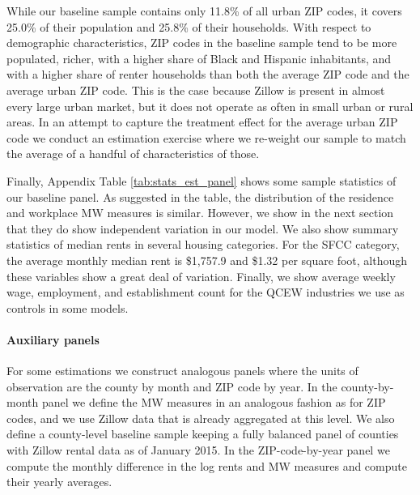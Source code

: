 While our baseline sample contains only 11.8\% of all urban ZIP codes, it covers
25.0\% of their population and 25.8\% of their households.
With respect to demographic characteristics, ZIP codes in the baseline sample 
tend to be more populated, richer, with a higher share of Black and Hispanic 
inhabitants, and with a higher share of renter households than both 
the average ZIP code and the average urban ZIP code.
This is the case because Zillow is present in almost every large urban market, 
but it does not operate as often in small urban or rural areas.
In an attempt to capture the treatment effect for the average urban ZIP code 
we conduct an estimation exercise where we re-weight our sample to match the 
average of a handful of characteristics of those.

Finally, Appendix Table \ref{tab:stats_est_panel} shows some sample statistics 
of our baseline panel.
As suggested in the table, the distribution of the residence and workplace MW 
measures is similar.
However, we show in the next section that they do show independent variation
in our model.
We also show summary statistics of median rents in several housing categories.
For the SFCC category, the average monthly median rent is \$1,757.9 and \$1.32 
per square foot, although these variables show a great deal of variation.
Finally, we show average weekly wage, employment, and establishment count 
for the QCEW industries we use as controls in some models.

\paragraph{Auxiliary panels}

For some estimations we construct analogous panels where the units of 
observation are the county by month and ZIP code by year.
In the county-by-month panel we define the MW measures in an analogous fashion 
as for ZIP codes, and we use Zillow data that is already aggregated at this 
level.
We also define a county-level baseline sample keeping a fully balanced panel of 
counties with Zillow rental data as of January 2015.
In the ZIP-code-by-year panel we compute the monthly difference in the log rents 
and MW measures and compute their yearly averages.
